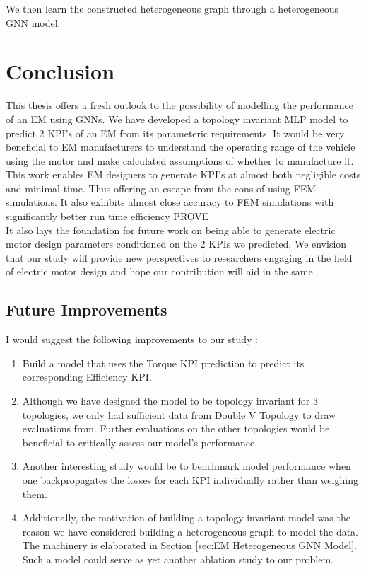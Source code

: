 \documentclass{report} %
\begin{document}
We then learn the constructed heterogeneous graph through a heterogeneous \ac{GNN} model.\\   

\newpage 

\chapter{Conclusion}

This thesis offers a fresh outlook to the possibility of modelling the performance of an \ac{EM} using \ac{GNN}s.
We have developed a topology invariant \ac{MLP} model to predict 2 \ac{KPI}'s of an \ac{EM} from its parameteric requirements. 
It would be very beneficial to \ac{EM} manufacturers to understand the operating range of the vehicle using the motor and make calculated assumptions of whether to manufacture it.\\
This work enables \ac{EM} designers to generate \ac{KPI}'s at almost both negligible costs and minimal time.
Thus offering an escape from the cons of using \ac{FEM} simulations. It also exhibits almost close accuracy to \ac{FEM} simulations with significantly better run time efficiency PROVE\\
It also lays the foundation for future work on being able to generate electric motor design parameters conditioned on the 2 KPIs we predicted.
We envision that our study will provide new perspectives to researchers engaging in the field of electric motor design and hope our contribution will aid in the same.\\
\section{Future Improvements}\label{sec:Future Improvements}

I would suggest the following improvements to our study : 

\begin{enumerate}
    \item Build a model that uses the Torque \ac{KPI} prediction to predict its corresponding Efficiency \ac{KPI}. 
    \item Although we have designed the model to be topology invariant for 3 topologies, we only had sufficient data from Double V Topology to draw evaluations from.
    Further evaluations on the other topologies would be beneficial to critically assess our model's performance.
    \item Another interesting study would be to benchmark model performance when one backpropagates the losses for each \ac{KPI} individually rather than weighing them.
    \item Additionally, the motivation of building a topology invariant model was the reason we have considered building a heterogeneous graph to model the data. The machinery is elaborated in Section \ref{sec:EM Heterogeneous GNN Model}.
    Such a model could serve as yet another ablation study to our problem.
\end{enumerate}
\end{document}
